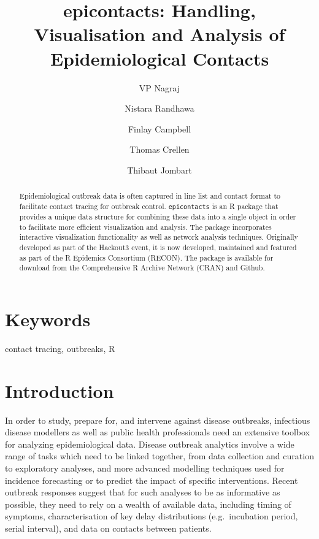 \documentclass[9pt,a4paper,]{extarticle}
\theoremstyle{definition}
\theoremstyle{definition}
\theoremstyle{definition}
\theoremstyle{remark}
\begin{document}
\pagestyle{front}

\title{epicontacts: Handling, Visualisation and Analysis of Epidemiological Contacts}

\author[1]{VP Nagraj}
\author[2]{Nistara Randhawa}
\author[3]{Finlay Campbell}
\author[4]{Thomas Crellen}
\author[3]{Thibaut Jombart}

\maketitle
\thispagestyle{front}

\begin{abstract}
Epidemiological outbreak data is often captured in line list and contact format to facilitate contact tracing for outbreak control. \texttt{epicontacts} is an R package that provides a unique data structure for combining these data into a single object in order to facilitate more efficient visualization and analysis. The package incorporates interactive visualization functionality as well as network analysis techniques. Originally developed as part of the Hackout3 event, it is now developed, maintained and featured as part of the R Epidemics Consortium (RECON). The package is available for download from the Comprehensive R Archive Network (CRAN) and Github.
\end{abstract}

\section*{Keywords}
contact tracing, outbreaks, R


\clearpage
\pagestyle{main}

\section{Introduction}\label{introduction}

In order to study, prepare for, and intervene against disease outbreaks, infectious disease modellers as well as public health professionals need an extensive toolbox for analyzing epidemiological data. Disease outbreak analytics involve a wide range of tasks which need to be linked together, from data collection and curation to exploratory analyses, and more advanced modelling techniques used for incidence forecasting\citep{funk:2016}\citep{nouvellet:2017} or to predict the impact of specific interventions\citep{nouvellet:2015}\citep{parker:2015}. Recent outbreak responses suggest that for such analyses to be as informative as possible, they need to rely on a wealth of available data, including timing of symptoms, characterisation of key delay distributions (e.g.~incubation period, serial interval), and data on contacts between patients\citep{cauchemez:2014}\citep{aylward:2014}\citep{agua-agum:2015}\citep{cori:2017}.
\end{document}
